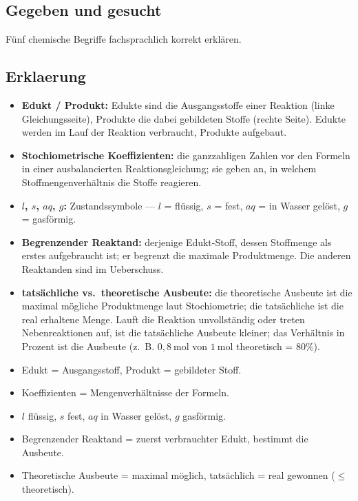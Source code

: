 
\subsection*{Gegeben und gesucht}
Fünf chemische Begriffe fachsprachlich korrekt erklären.

\subsection*{Erklaerung}
\begin{itemize}
  \item[a)] \textbf{Edukt / Produkt:} Edukte sind die Ausgangsstoffe einer
        Reaktion (linke Gleichungsseite), Produkte die dabei gebildeten Stoffe
        (rechte Seite). Edukte werden im Lauf der Reaktion verbraucht,
        Produkte aufgebaut.
  \item[b)] \textbf{Stochiometrische Koeffizienten:} die ganzzahligen Zahlen
        vor den Formeln in einer ausbalancierten Reaktionsgleichung; sie
        geben an, in welchem Stoffmengenverhältnis die Stoffe reagieren.
  \item[c)] \textbf{$l$, $s$, $aq$, $g$:} Zustandssymbole --- $l$ = flüssig,
        $s$ = fest, $aq$ = in Wasser gelöst, $g$ = gasförmig.
  \item[d)] \textbf{Begrenzender Reaktand:} derjenige Edukt-Stoff, dessen
        Stoffmenge als erstes aufgebraucht ist; er begrenzt die maximale
        Produktmenge. Die anderen Reaktanden sind im Ueberschuss.
  \item[e)] \textbf{tatsächliche vs.\ theoretische Ausbeute:} die
        theoretische Ausbeute ist die maximal mögliche Produktmenge laut
        Stochiometrie; die tatsächliche ist die real erhaltene Menge. Lauft
        die Reaktion unvollständig oder treten Nebenreaktionen auf, ist die
        tatsächliche Ausbeute kleiner; das Verhältnis in Prozent ist die
        Ausbeute (z.~B. $0{,}8\ \mathrm{mol}$ von $1\ \mathrm{mol}$
        theoretisch = $80\%$).
\end{itemize}

\begin{ergebnis}
\begin{itemize}
  \item[] Edukt = Ausgangsstoff, Produkt = gebildeter Stoff.
  \item[] Koeffizienten = Mengenverhältnisse der Formeln.
  \item[] $l$ flüssig, $s$ fest, $aq$ in Wasser gelöst, $g$ gasförmig.
  \item[] Begrenzender Reaktand = zuerst verbrauchter Edukt, bestimmt die
        Ausbeute.
  \item[] Theoretische Ausbeute = maximal möglich, tatsächlich = real
        gewonnen ($\le$ theoretisch).
\end{itemize}
\end{ergebnis}

